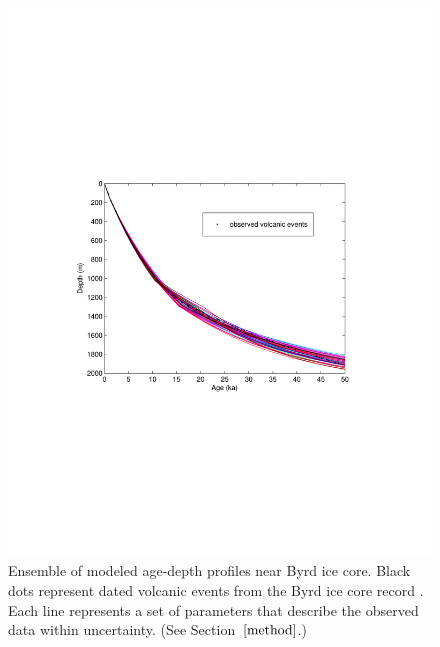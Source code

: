 \documentclass[12pt]{article}
\begin{document}
\begin{figure}[ht]
\begin{center}
\includegraphics[scale=0.75]{figures/agedepth_metrop}
\captionsetup{width=.9\textwidth}
\vspace*{-10mm}
\caption{ Ensemble of modeled age-depth profiles near Byrd ice core.  Black dots represent dated volcanic events from the Byrd ice core record \citep{hammer1994}. Each line represents a set of parameters that describe the observed data within uncertainty. (See Section~$\ref{method}$.)   }
\label{fig:spaghetti}
\end{center}
\end{figure}
\end{document}
